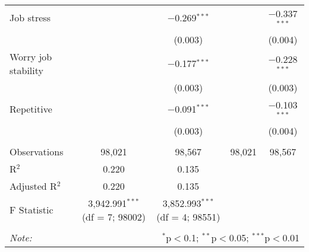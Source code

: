\begin{table}[!htbp]
\begin{tabular}{@{\extracolsep{3pt}}lcccc}
  Job stress &  & $-$0.269$^{***}$ &  & $-$0.337$^{***}$ \\ 
  &  & (0.003) &  & (0.004) \\ 
  Worry job stability &  & $-$0.177$^{***}$ &  & $-$0.228$^{***}$ \\ 
  &  & (0.003) &  & (0.003) \\ 
  Repetitive &  & $-$0.091$^{***}$ &  & $-$0.103$^{***}$ \\ 
  &  & (0.003) &  & (0.004) \\ 
 \hline \\[-1.8ex] 
Observations & 98,021 & 98,567 & 98,021 & 98,567 \\ 
R$^{2}$ & 0.220 & 0.135 &  &  \\ 
Adjusted R$^{2}$ & 0.220 & 0.135 &  &  \\ 
F Statistic & 3,942.991$^{***}$ (df = 7; 98002) & 3,852.993$^{***}$ (df = 4; 98551) &  &  \\ 
\hline 
\hline \\[-1.8ex] 
\textit{Note:}  & \multicolumn{4}{r}{$^{*}$p$<$0.1; $^{**}$p$<$0.05; $^{***}$p$<$0.01} \\ 
\end{tabular} 
\end{table} 
